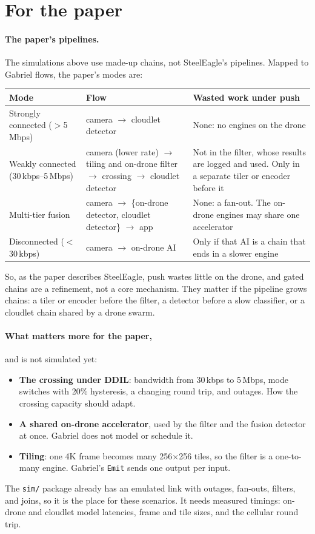 \documentclass[11pt]{article}
\newcommand{\code}[1]{\texttt{#1}}
\begin{document}
\section{For the paper}
\label{sec:paper}

\paragraph{The paper's pipelines.} The simulations above use made-up
chains, not SteelEagle's pipelines. Mapped to Gabriel flows, the paper's
modes are:
\begin{center}
\small
\begin{tabular}{@{}p{3.3cm}p{6.3cm}p{4.3cm}@{}}
\toprule
Mode & Flow & Wasted work under push \\
\midrule
Strongly connected ($>$5\,Mbps) & camera $\to$ cloudlet detector &
  None: no engines on the drone \\
Weakly connected (30\,kbps--5\,Mbps) & camera (lower rate) $\to$ tiling and
  on-drone filter $\to$ crossing $\to$ cloudlet detector &
  Not in the filter, whose results are logged and used. Only in a separate
  tiler or encoder before it \\
Multi-tier fusion & camera $\to$ \{on-drone detector, cloudlet detector\}
  $\to$ app & None: a fan-out. The on-drone engines may share one
  accelerator \\
Disconnected ($<$30\,kbps) & camera $\to$ on-drone AI &
  Only if that AI is a chain that ends in a slower engine \\
\bottomrule
\end{tabular}
\end{center}
So, as the paper describes SteelEagle, push wastes little on the drone, and
gated chains are a refinement, not a core mechanism. They matter if the
pipeline grows chains: a tiler or encoder before the filter, a detector
before a slow classifier, or a cloudlet chain shared by a drone swarm.

\paragraph{What matters more for the paper,} and is not simulated yet:
\begin{itemize}[nosep]
  \item \textbf{The crossing under DDIL}: bandwidth from 30\,kbps to
        5\,Mbps, mode switches with 20\% hysteresis, a changing round
        trip, and outages. How the crossing capacity should adapt.
  \item \textbf{A shared on-drone accelerator}, used by the filter and the
        fusion detector at once. Gabriel does not model or schedule it.
  \item \textbf{Tiling}: one 4K frame becomes many 256$\times$256 tiles, so
        the filter is a one-to-many engine. Gabriel's \code{Emit} sends one
        output per input.
\end{itemize}
The \code{sim/} package already has an emulated link with outages,
fan-outs, filters, and joins, so it is the place for these scenarios. It
needs measured timings: on-drone and cloudlet model latencies, frame and
tile sizes, and the cellular round trip.
\end{document}
